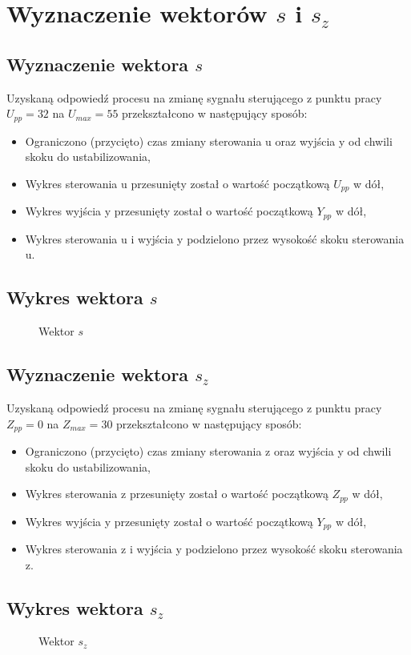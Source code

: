\section{Wyznaczenie wektorów $s$ i $s_z$ }
\label{projekt:zad3}

\subsection{Wyznaczenie wektora $s$}
\label{projekt:zad3:s}

Uzyskaną odpowiedź procesu na zmianę sygnału sterującego z punktu pracy $U_{pp} = 32$ na
$U_{max} = 55$ przekształcono w następujący sposób: 
\begin{itemize}
    \item Ograniczono (przycięto) czas zmiany sterowania u oraz wyjścia y od chwili skoku do ustabilizowania, 
    \item Wykres sterowania u przesunięty został o wartość początkową $U_{pp}$ w dół, 
    \item Wykres wyjścia y przesunięty został o wartość początkową $Y_{pp}$ w dół, 
    \item Wykres sterowania u i wyjścia y podzielono przez wysokość skoku sterowania u. 
\end{itemize}

\subsection{Wykres wektora $s$}

\begin{figure}[H] 
    \centering
    
    \caption{Wektor $s$}
    \label{projekt:zad3:s:figure}
\end{figure}

\newpage

\subsection{Wyznaczenie wektora $s_z$}
\label{projekt:zad3:sz}

Uzyskaną odpowiedź procesu na zmianę sygnału sterującego z punktu pracy $Z_{pp} = 0$ na
$Z_{max} = 30$ przekształcono w następujący sposób: 
\begin{itemize}
    \item Ograniczono (przycięto) czas zmiany sterowania z oraz wyjścia y od chwili skoku do ustabilizowania, 
    \item Wykres sterowania z przesunięty został o wartość początkową $Z_{pp}$ w dół, 
    \item Wykres wyjścia y przesunięty został o wartość początkową $Y_{pp}$ w dół, 
    \item Wykres sterowania z i wyjścia y podzielono przez wysokość skoku sterowania z. 
\end{itemize}


\subsection{Wykres wektora $s_{z}$}

\begin{figure}[H] 
    \centering
    
    \caption{Wektor $s_{z}$}
    \label{projekt:zad3:sz:figure}
\end{figure}

\newpage
